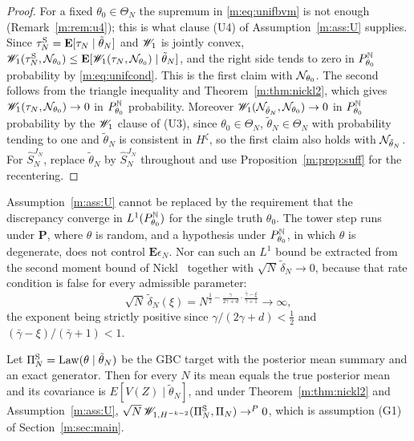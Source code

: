 \begin{proof}
For a fixed $\theta_0\in\Theta_N$ the supremum in \eqref{m:eq:unifbvm} is not enough (Remark~\ref{m:rem:u4}); this is what clause (U4) of Assumption~\ref{m:ass:U} supplies. Since $\tau^{\rm S}_N=\mathbf{E}[\tau_N\mid\tilde\theta_N]$ and $\mathscr{W}_1$ is jointly convex, $\mathscr{W}_1(\tau^{\rm S}_N,\mathcal{N}_{\theta_0})\le\mathbf{E}[\mathscr{W}_1(\tau_N,\mathcal{N}_{\theta_0})\mid\tilde\theta_N]$, and the right side tends to zero in $P^{\mathbb{N}}_{\theta_0}$ probability by \eqref{m:eq:unifcond}. This is the first claim with $\mathcal{N}_{\theta_0}$. The second follows from the triangle inequality and Theorem~\ref{m:thm:nickl2}, which gives $\mathscr{W}_1(\tau_N,\mathcal{N}_{\theta_0})\to0$ in $P^{\mathbb{N}}_{\theta_0}$ probability. Moreover $\mathscr{W}_1(\mathcal{N}_{\tilde\theta_N},\mathcal{N}_{\theta_0})\to0$ in $P^{\mathbb{N}}_{\theta_0}$ probability by the $\mathscr{W}_1$ clause of (U3), since $\theta_0\in\Theta_N$, $\tilde\theta_N\in\Theta_N$ with probability tending to one and $\tilde\theta_N$ is consistent in $H^\zeta$, so the first claim also holds with $\mathcal{N}_{\tilde\theta_N}$. For $\hat S^{J_N}_N$, replace $\tilde\theta_N$ by $\hat S^{J_N}_N$ throughout and use Proposition~\ref{m:prop:suff} for the recentering.
\end{proof}

\begin{remark}\label{m:rem:jwmeasure}
Assumption~\ref{m:ass:U} cannot be replaced by the requirement that the discrepancy converge in $L^1(P^{\mathbb{N}}_{\theta_0})$ for the single truth $\theta_0$. The tower step runs under $\mathbf{P}$, where $\theta$ is random, and a hypothesis under $P^{\mathbb{N}}_{\theta_0}$, in which $\theta$ is degenerate, does not control $\mathbf{E}\epsilon_N$. Nor can such an $L^1$ bound be extracted from the second moment bound of Nickl~\cite[equation (39)]{nicklbvm2024} together with $\sqrt N\,\tilde\delta_N\to0$, because that rate condition is false for every admissible parameter:
\[
\sqrt N\,\tilde\delta_N(\xi)=N^{\frac12-\frac{\gamma}{2\gamma+d}\cdot\frac{\bar\gamma-\xi}{\bar\gamma+1}}\longrightarrow\infty ,
\]
the exponent being strictly positive since $\gamma/(2\gamma+d)<\tfrac12$ and $(\bar\gamma-\xi)/(\bar\gamma+1)<1$.
\end{remark}

\begin{corollary}\label{m:cor:jwgbc}
Let $\Pi^{\rm S}_N=\operatorname{Law}(\theta\mid\tilde\theta_N)$ be the GBC target with the posterior mean summary and an exact generator. Then for every $N$ its mean equals the true posterior mean and its covariance is $E[V(Z)\mid\tilde\theta_N]$, and under Theorem~\ref{m:thm:nickl2} and Assumption~\ref{m:ass:U}, $\sqrt N\,\mathscr{W}_{1,H^{-k-2}}(\Pi^{\rm S}_N,\Pi_N)\to^P0$, which is assumption (G1) of Section~\ref{m:sec:main}.
\end{corollary}

